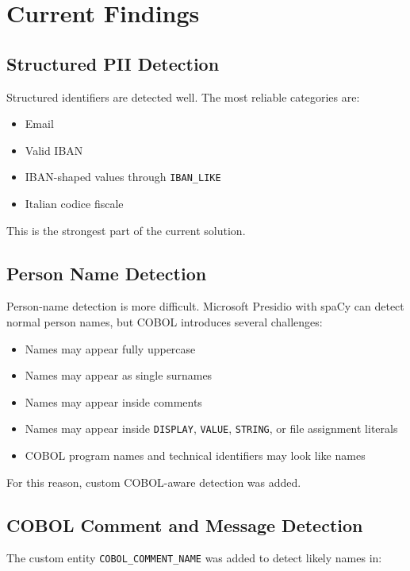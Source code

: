 ﻿\documentclass[11pt,a4paper]{article}
\newcommand{\code}[1]{\texttt{#1}}
\begin{document}
\section{Current Findings}

\subsection{Structured PII Detection}

Structured identifiers are detected well. The most reliable categories are:

\begin{itemize}
  \item Email
  \item Valid IBAN
  \item IBAN-shaped values through \code{IBAN\_LIKE}
  \item Italian codice fiscale
\end{itemize}

This is the strongest part of the current solution.

\subsection{Person Name Detection}

Person-name detection is more difficult. Microsoft Presidio with spaCy can detect normal person names, but COBOL introduces several challenges:

\begin{itemize}
  \item Names may appear fully uppercase
  \item Names may appear as single surnames
  \item Names may appear inside comments
  \item Names may appear inside \code{DISPLAY}, \code{VALUE}, \code{STRING}, or file assignment literals
  \item COBOL program names and technical identifiers may look like names
\end{itemize}

For this reason, custom COBOL-aware detection was added.

\subsection{COBOL Comment and Message Detection}

The custom entity \code{COBOL\_COMMENT\_NAME} was added to detect likely names in:
\end{document}
